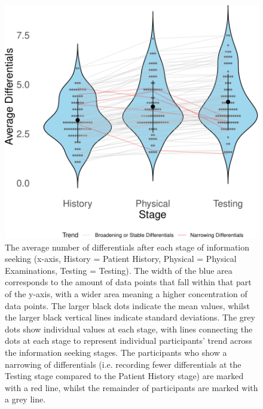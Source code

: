 \documentclass[a4paper, nobind]{templates/ociamthesis}
\begin{document}
\newpage

\begin{figure}[H]

{\centering \includegraphics[width=1\linewidth]{_main_files/figure-latex/diffsOverStages-1} 

}

\caption[Online Study: Average Differentials by Stage (Violin Plot)]{The average number of differentials after each stage of information seeking (x-axis, History = Patient History, Physical = Physical Examinations, Testing = Testing). The width of the blue area corresponds to the amount of data points that fall within that part of the y-axis, with a wider area meaning a higher concentration of data points. The larger black dots indicate the mean values, whilst the larger black vertical lines indicate standard deviations. The grey dots show individual values at each stage, with lines connecting the dots at each stage to represent individual participants' trend across the information seeking stages. The participants who show a narrowing of differentials (i.e. recording fewer differentials at the Testing stage compared to the Patient History stage) are marked with a red line, whilst the remainder of participants are marked with a grey line.}\label{fig:diffsOverStages}
\end{figure}
\end{document}

